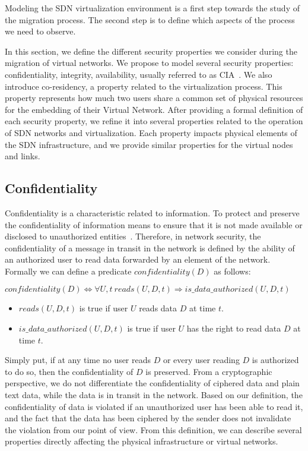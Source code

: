 \label{sec:security_prop}
Modeling the SDN virtualization environment is a first step towards the study of the migration process. The second step is to define which aspects of the process we need to observe.

In this section, we define the different security properties we consider during the migration of virtual networks.
We propose to model several security properties: confidentiality, integrity, availability, usually referred to as CIA~\cite{ISO/IEC270012013}. We also introduce co-residency, a property related to the virtualization process. This property represents how much two users share a common set of physical resources for the embedding of their Virtual Network.
After providing a formal definition of each security property, we refine it into several properties related to the operation of SDN networks and virtualization. 
Each property impacts physical elements of the SDN infrastructure, and we provide similar properties for the virtual nodes and links.

\subsection{Confidentiality}
\label{sec:prop-conf}
Confidentiality is a characteristic related to information.
To protect and preserve the confidentiality of information means to ensure that it is not made available or disclosed to unauthorized entities~\cite{ISO/IEC270012013}.
Therefore, in network security, the confidentiality of a message in transit in the network is defined by the ability of an authorized  user to read data forwarded by an element of the network.
Formally we can define a predicate $confidentiality(D)$ as follows:

\begin{myformula}
$ confidentiality(D) \Leftrightarrow \forall U,t~reads(U,D,t) \Rightarrow is\_data\_authorized(U,D,t)$
\end{myformula}

\begin{itemize}
\item $reads(U,D,t)$ is true if user $U$ reads data $D$ at time $t$.
\item $is\_data\_authorized(U,D,t)$ is true if user $U$ has the right to read data $D$ at time $t$.
\end{itemize}
Simply put, if at any time no user reads $D$ or every user reading $D$ is authorized to do so, then the confidentiality of $D$ is preserved.
From a cryptographic perspective, we do not differentiate the confidentiality of ciphered data and plain text data, while the data is in transit in the network.
Based on our definition, the confidentiality of data is violated if an unauthorized user has been able to read it, and the fact that the data has been ciphered by the sender does not invalidate the violation from our point of view.
From this definition, we can describe several properties directly affecting the physical infrastructure or virtual networks.


